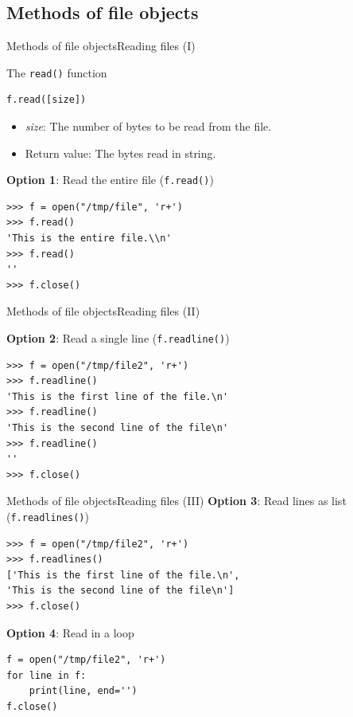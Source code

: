 \documentclass[10pt,compress]{beamer} %
\begin{document}
\subsection{Methods of file objects}
\begin{frame}[fragile]{Methods of file objects}{Reading files (I)}
	\begin{block}{The \texttt{read()} function}
\begin{verbatim}
f.read([size])
\end{verbatim}

	\vspace{-0.5cm}
	\begin{itemize}
	\item \textit{size}: The number of bytes to be read from the file.
	\item Return value: The bytes read in string.
	\end{itemize}
	\end{block}
\textbf{Option 1}: Read the entire file (\texttt{f.read()})
\begin{verbatim}
>>> f = open("/tmp/file", 'r+')
>>> f.read()
'This is the entire file.\\n'
>>> f.read()
''
>>> f.close()
\end{verbatim}
	
\end{frame}

\begin{frame}[fragile]{Methods of file objects}{Reading files (II)}
	

	\textbf{Option 2}: Read a single line (\texttt{f.readline()})
\begin{verbatim}
>>> f = open("/tmp/file2", 'r+')
>>> f.readline()
'This is the first line of the file.\n'
>>> f.readline()
'This is the second line of the file\n'
>>> f.readline()
''
>>> f.close()
\end{verbatim}

\end{frame}

\begin{frame}[fragile]{Methods of file objects}{Reading files (III)}
	\textbf{Option 3}: Read lines as list (\texttt{f.readlines()})
\begin{verbatim}
>>> f = open("/tmp/file2", 'r+')
>>> f.readlines()
['This is the first line of the file.\n',
'This is the second line of the file\n']
>>> f.close()
\end{verbatim}

	\textbf{Option 4}: Read in a loop
\begin{verbatim}
f = open("/tmp/file2", 'r+')
for line in f:
    print(line, end='')
f.close()
\end{verbatim}
\end{frame}
\end{document}
